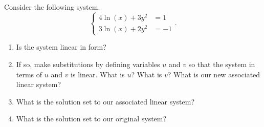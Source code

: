 \documentclass[nooutcomes]{ximera}
\begin{document}
\begin{exploration}
Consider the following system.
$$
\begin{cases}
4\ln(x) + 3y^2 & =  1 \\

3\ln(x) + 2y^2 & =  -1
\end{cases}.
$$
\begin{enumerate}
\item Is the system linear in form?
\item If so, make substitutions by defining variables $u$ and $v$ so that the system in terms of $u$ and $v$ is linear. What is $u$? What is $v$? What is our new associated linear system?
\item What is the solution set to our associated linear system?
\item What is the solution set to our original system?
\end{enumerate}
\end{exploration}
\end{document}
